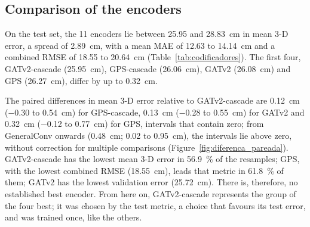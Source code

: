 \subsection{Comparison of the encoders}
\label{sec:codificadores}

On the test set, the \num{11} encoders lie between \num{25.95} and \qty{28.83}{\cm} in mean 3-D error, a spread of \qty{2.89}{\cm}, with a mean MAE of \num{12.63} to \qty{14.14}{\cm} and a combined RMSE of \num{18.55} to \qty{20.64}{\cm} (Table~\ref{tab:codificadores}). The first four, GATv2-cascade (\qty{25.95}{\cm}), GPS-cascade (\qty{26.06}{\cm}), GATv2 (\qty{26.08}{\cm}) and GPS (\qty{26.27}{\cm}), differ by up to \qty{0.32}{\cm}.

\begin{table}[H]
  \centering
  \caption{The \num{11} encoders of the final comparison, with capacity matched to \num{1843395} parameters, in increasing order of mean 3-D error on the \num{937} test events; mean MAE, combined RMSE and mean 3-D error in cm. $D$: width of the node states; $B$: batch size chosen by the memory probe (\num{128}, \num{256} or \num{512} mirrored training rows, which correspond to \num{22250}, \num{11150} and \num{5600} optimisation steps over \num{50} epochs, respectively), with the learning rates multiplied by $B$/\num{128}. $^{\dagger}$: does not read the edge features. The first four cannot be distinguished by the paired resampling (Figure~\ref{fig:diferenca_pareada}).}
  \label{tab:codificadores}
  
\end{table}

The paired differences in mean 3-D error relative to GATv2-cascade are \qty[retain-explicit-plus]{+0.12}{\cm} (\num{-0.30} to \qty{0.54}{\cm}) for GPS-cascade, \qty[retain-explicit-plus]{+0.13}{\cm} (\num{-0.28} to \qty{0.55}{\cm}) for GATv2 and \qty[retain-explicit-plus]{+0.32}{\cm} (\num{-0.12} to \qty{0.77}{\cm}) for GPS, intervals that contain zero; from GeneralConv onwards (\qty[retain-explicit-plus]{+0.48}{\cm}; \num{0.02} to \qty{0.95}{\cm}), the intervals lie above zero, without correction for multiple comparisons (Figure~\ref{fig:diferenca_pareada}). GATv2-cascade has the lowest mean 3-D error in \qty{56.9}{\percent} of the resamples; GPS, with the lowest combined RMSE (\qty{18.55}{\cm}), leads that metric in \qty{61.8}{\percent} of them; GATv2 has the lowest validation error (\qty{25.72}{\cm}). There is, therefore, no established best encoder. From here on, GATv2-cascade represents the group of the four best; it was chosen by the test metric, a choice that favours its test error, and was trained once, like the others.

